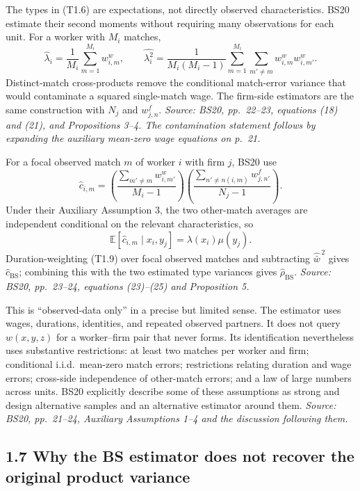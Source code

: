 \documentclass[11pt]{article}
\begin{document}
The types in (T1.6) are expectations, not directly observed characteristics.
BS20 estimate their second moments without requiring many observations for
each unit.  For a worker with \(M_i\) matches,
\[
\widehat\lambda_i
=\frac1{M_i}\sum_{m=1}^{M_i}w^w_{i,m},
\qquad
\widehat{\lambda_i^2}
=\frac{1}{M_i(M_i-1)}
\sum_{m=1}^{M_i}\sum_{m'\ne m}
w^w_{i,m}w^w_{i,m'}.
\tag{T1.8}
\]
Distinct-match cross-products remove the conditional match-error variance that
would contaminate a squared single-match wage.  The firm-side estimators are
the same construction with \(N_j\) and \(w^f_{j,n}\).
\textit{Source: BS20, pp.\ 22--23, equations (18) and (21), and
Propositions 3--4.  The contamination statement follows by expanding the
auxiliary mean-zero wage equations on p.\ 21.}

For a focal observed match \(m\) of worker \(i\) with firm \(j\), BS20 use
\[
\widehat c_{i,m}
=
\left(\frac{\sum_{m'\ne m}w^w_{i,m'}}{M_i-1}\right)
\left(\frac{\sum_{n'\ne n(i,m)}w^f_{j,n'}}{N_j-1}\right).
\tag{T1.9}
\]
Under their Auxiliary Assumption 3, the two other-match averages are
independent conditional on the relevant characteristics, so
\[
\mathbb E[\widehat c_{i,m}\mid x_i,y_j]
=\lambda(x_i)\mu(y_j).
\tag{T1.10}
\]
Duration-weighting (T1.9) over focal observed matches and subtracting
\(\widehat{\bar w}^{\,2}\) gives \(\widehat c_{\mathrm{BS}}\); combining this
with the two estimated type variances gives
\(\widehat\rho_{\mathrm{BS}}\).
\textit{Source: BS20, pp.\ 23--24, equations (23)--(25) and Proposition 5.}

This is ``observed-data only'' in a precise but limited sense.  The estimator
uses wages, durations, identities, and repeated observed partners.  It does
not query \(w(x,y,z)\) for a worker--firm pair that never forms.  Its
identification nevertheless uses substantive restrictions: at least two
matches per worker and firm; conditional i.i.d.\ mean-zero match errors;
restrictions relating duration and wage errors; cross-side independence of
other-match errors; and a law of large numbers across units.  BS20 explicitly
describe some of these assumptions as strong and design alternative samples
and an alternative estimator around them.
\textit{Source: BS20, pp.\ 21--24, Auxiliary Assumptions 1--4 and the
discussion following them.}

\subsection{1.7 Why the BS estimator does not recover the original product variance}
\end{document}

